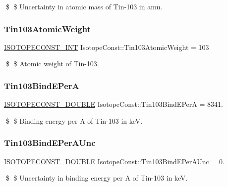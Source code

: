 \$ \$ Uncertainty in atomic mass of Tin-\/103 in amu. \mbox{\label{group___isotope_const-_tin-_sn103_ga50eb24257ab7dbe660ce88a19f924828}} 
\subsubsection{\texorpdfstring{Tin103\+Atomic\+Weight}{Tin103AtomicWeight}}
{\footnotesize\ttfamily \mbox{\hyperlink{group___isotope_const-_macros_ga5f18360b3e99483a35c32d789e62621c}{I\+S\+O\+T\+O\+P\+E\+C\+O\+N\+S\+T\+\_\+\+I\+NT}} Isotope\+Const\+::\+Tin103\+Atomic\+Weight = 103}

\$ \$ Atomic weight of Tin-\/103. \mbox{\label{group___isotope_const-_tin-_sn103_gac93d327ca57c9f04fdf5fac7bff22ada}} 
\subsubsection{\texorpdfstring{Tin103\+Bind\+E\+PerA}{Tin103BindEPerA}}
{\footnotesize\ttfamily \mbox{\hyperlink{group___isotope_const-_macros_ga8f45a7272ce02c0b4c65c44636ed719a}{I\+S\+O\+T\+O\+P\+E\+C\+O\+N\+S\+T\+\_\+\+D\+O\+U\+B\+LE}} Isotope\+Const\+::\+Tin103\+Bind\+E\+PerA = 8341.}

\$ \$ Binding energy per A of Tin-\/103 in keV. \mbox{\label{group___isotope_const-_tin-_sn103_ga4ad36eca8694023076cd251e40b76de3}} 
\subsubsection{\texorpdfstring{Tin103\+Bind\+E\+Per\+A\+Unc}{Tin103BindEPerAUnc}}
{\footnotesize\ttfamily \mbox{\hyperlink{group___isotope_const-_macros_ga8f45a7272ce02c0b4c65c44636ed719a}{I\+S\+O\+T\+O\+P\+E\+C\+O\+N\+S\+T\+\_\+\+D\+O\+U\+B\+LE}} Isotope\+Const\+::\+Tin103\+Bind\+E\+Per\+A\+Unc = 0.}

\$ \$ Uncertainty in binding energy per A of Tin-\/103 in keV. \mbox{\label{group___isotope_const-_tin-_sn103_ga49bf72fb2282c5f40c7c6f8e5d2f1bd6}} 

